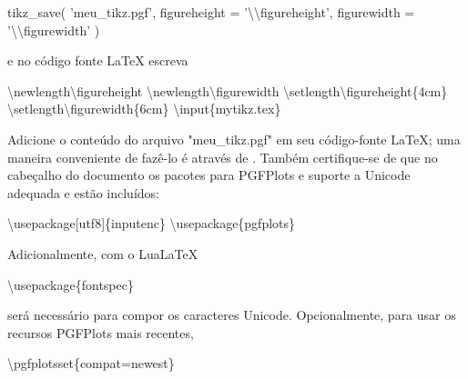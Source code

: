 \documentclass[11pt]{article}
\newenvironment{Shaded}{}{}
\newcommand{\CharTok}[1]{\textcolor[rgb]{0.25,0.44,0.63}{{#1}}}
\newcommand{\StringTok}[1]{\textcolor[rgb]{0.25,0.44,0.63}{{#1}}}
\newcommand{\NormalTok}[1]{{#1}}
\newcommand{\OperatorTok}[1]{\textcolor[rgb]{0.40,0.40,0.40}{{#1}}}
\begin{document}
\begin{Shaded}
\begin{Highlighting}[]
    \NormalTok{tikz_save(}
        \StringTok{'meu_tikz.pgf'}\NormalTok{,}
        \NormalTok{figureheight }\OperatorTok{=} \StringTok{'}\CharTok{\textbackslash{}\textbackslash{}}\StringTok{figureheight'}\NormalTok{,}
        \NormalTok{figurewidth }\OperatorTok{=} \StringTok{'}\CharTok{\textbackslash{}\textbackslash{}}\StringTok{figurewidth'}
        \NormalTok{)}
\end{Highlighting}
\end{Shaded}

e no código fonte LaTeX escreva

\begin{Shaded}
\begin{Highlighting}[]
    \NormalTok{\textbackslash{}newlength\textbackslash{}figureheight}
    \NormalTok{\textbackslash{}newlength\textbackslash{}figurewidth}
    \NormalTok{\textbackslash{}setlength\textbackslash{}figureheight\{4cm\}}
    \NormalTok{\textbackslash{}setlength\textbackslash{}figurewidth\{6cm\}}
    \NormalTok{\textbackslash{}input\{mytikz.tex\}}
\end{Highlighting}
\end{Shaded}

Adicione o conteúdo do arquivo "meu\_tikz.pgf" em seu código-fonte
LaTeX; uma maneira conveniente de fazê-lo é através de
\verb||. Também certifique-se de que no cabeçalho
do documento os pacotes para PGFPlots e suporte a Unicode adequada e
estão incluídos:

\begin{Shaded}
\begin{Highlighting}[]
    \NormalTok{\textbackslash{}usepackage[utf8]\{inputenc\}}
    \NormalTok{\textbackslash{}usepackage\{pgfplots\}}
\end{Highlighting}
\end{Shaded}

Adicionalmente, com o LuaLaTeX

\begin{Shaded}
\begin{Highlighting}[]
    \NormalTok{\textbackslash{}usepackage\{fontspec\}}
\end{Highlighting}
\end{Shaded}

será necessário para compor os caracteres Unicode. Opcionalmente, para
usar os recursos PGFPlots mais recentes,

\begin{Shaded}
\begin{Highlighting}[]
    \NormalTok{\textbackslash{}pgfplotsset\{compat=newest\}}
\end{Highlighting}
\end{Shaded}
\end{document}
